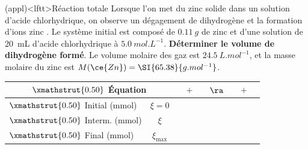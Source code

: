 \documentclass[../../main/main.tex]{subfiles}
\begin{document}
\begin{tcb}[width=\linewidth, breakable](appl)<lftt>{Réaction totale}
	Lorsque l'on met du zinc solide dans un solution d'acide chlorhydrique, on
	observe un dégagement de dihydrogène et la formation d'ions zinc
	.
	\smallbreak
	Le système initial est composé de $\SI{0.11}{g}$ de zinc et
	d'une solution de \SI{20}{mL} d'acide chlorhydrique à $\SI{5.0}{mol.L^{-1}}$.
	\smallbreak
	\textbf{Déterminer le volume de dihydrogène formé}.
	\smallbreak
	Le volume molaire des gaz est $\SI{24.5}{L.mol^{-1}}$, et la masse molaire du
	zinc est $M(\ce{Zn}) = \SI{65.38}{g.mol^{-1}}$.
	\tcblower
	\begin{center}
		\def\rhgt{0.50}
		\centering
		\begin{tabularx}{\linewidth}{|l|c|YdYdYdY|}
			\hline
			\multicolumn{2}{|c|}{
				$\xmathstrut{\rhgt}$
			\textbf{Équation}}          &
			      & $+$          &
			    & $\ra$        &
			 & $+$          &
			                       \\
			\hline
			$\xmathstrut{\rhgt}$
			Initial (\si{mmol})         & $\xi = 0$    &
			           & \vline       &
			           & \vline       &
			             & \vline       &
			                              \\
			\hline
			$\xmathstrut{\rhgt}$
			Interm. (\si{mmol})         & $\xi$        &
			      & \vline       &
			     & \vline       &
			\psw{$\xi$}                 & \vline       &
			\psw{$\xi$}                                  \\
			\hline
			$\xmathstrut{\rhgt}$
			Final (\si{mmol})           & $\xi_{\max}$ &
			             & \vline       &
			          & \vline       &
			           & \vline       &
			                            \\
			\hline
		\end{tabularx}
	\end{center}
\end{tcb}
\end{document}
